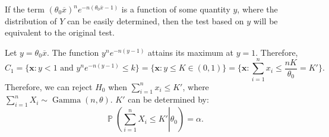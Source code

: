 \documentclass{huhtakm-template-book-v2}
\DeclareMathOperator{\prob}{\mathbb{P}}
\DeclareMathOperator{\Gam}{Gamma}
\begin{document}
\begin{eg}
        If the term $(\theta_{0}\overline{x})^{n}e^{-n(\theta_{0}\overline{x}-1)}$ is a function of some quantity $y$, where the distribution of $Y$ can be easily determined, then the test based on $y$ will be equivalent to the original test.
        
        Let $y=\theta_{0}\overline{x}$. The function $y^{n}e^{-n(y-1)}$ attains its maximum at $y=1$. Therefore,
        \begin{equation*}
            C_{1}=\bigl\{\mathbf{x}:y<1\text{ and }y^{n}e^{-n(y-1)}\leq k\bigr\}=\{\mathbf{x}:y\leq K\in(0,1)\}=\biggl\{\mathbf{x}:\sum_{i=1}^{n}x_{i}\leq\frac{nK}{\theta_{0}}=K'\biggr\}.
        \end{equation*}
        Therefore, we can reject $H_{0}$ when $\sum_{i=1}^{n}x_{i}\leq K'$, where $\sum_{i=1}^{n}X_{i}\sim\Gam(n,\theta)$. $K'$ can be determined by:
        \begin{equation*}
            \prob\left(\left.\sum_{i=1}^{n}X_{i}\leq K'\right|\theta_{0}\right)=\alpha.
        \end{equation*}
    \end{eg}
    \newpage
    
\end{document}
